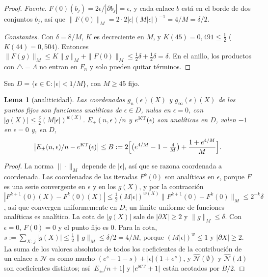 \documentclass[11pt,a4paper]{article}
\newtheorem{lema}[teorema]{Lema}
\theoremstyle{remark}
\begin{document}
\begin{proof}
\emph{Fuente.} $F(0)(b_j)=2\epsilon/|\partial b_j|=\epsilon$, y cada enlace $b$ está en el borde de
dos conjuntos $b_j$, así que $\|F(0)\|_M=2\cdot2|\epsilon|(M|\epsilon|)^{-1}=4/M=\delta/2$.

\emph{Constantes.} Con $\delta=8/M$, $K$ es decreciente en $M$, y $K(45)=0{,}491\le\tfrac12$
($K(44)=0{,}504$). Entonces $\|F(g)\|_M\le K\|g\|_M+\|F(0)\|_M\le\tfrac12\delta+\tfrac12\delta=\delta$.
En el anillo, los productos con $\triangle=\Lambda$ no entran en $F_n$ y solo pueden quitar términos.
\end{proof}

Sea $D=\{\epsilon\in\mathbb C:|\epsilon|<1/M\}$, con $M\ge45$ fijo.

\begin{lema}[analiticidad]\label{lem:analitico}
Las coordenadas $g_n(\epsilon)(X)$ y $g_\infty(\epsilon)(X)$ de los puntos fijos son funciones analíticas de
$\epsilon\in D$, nulas en $\epsilon=0$, con $|g(X)|\le\tfrac\delta2(M|\epsilon|)^{w(X)}$. $E_\pm(n,\epsilon)/n$ y
$e^{\rm KT}(\epsilon)$ son analíticas en $D$, valen $-1$ en $\epsilon=0$ y, en $D$,
\[
  \big|E_\pm(n,\epsilon)/n-e^{\rm KT}(\epsilon)\big|\le B:=2\Big[\big(e^{4/M}-1-\tfrac4M\big)+\frac{1+e^{4/M}}M\Big].
\]
\end{lema}

\begin{proof}
La norma $\|\cdot\|_M$ depende de $|\epsilon|$, así que se razona coordenada a coordenada. Las coordenadas
de las iteradas $F^k(0)$ son analíticas en $\epsilon$, porque $F$ es una serie convergente en $\epsilon$ y
en los $g(X)$, y por la contracción
$|F^{k+1}(0)(X)-F^k(0)(X)|\le\tfrac12(M|\epsilon|)^{w(X)}\|F^{k+1}(0)-F^k(0)\|_M\le2^{-k}\delta$, así que
convergen uniformemente en $D$; un límite uniforme de funciones analíticas es analítico. La cota de
$|g(X)|$ sale de $|\partial X|\ge2$ y $\|g\|_M\le\delta$. Con $\epsilon=0$, $F(0)=0$ y el punto fijo es $0$. Para
la cota, $s:=\sum_{X:\,j}|g(X)|\le\tfrac12\|g\|_M\le\delta/2=4/M$, porque $(M|\epsilon|)^{w}\le1$ y
$|\partial X|\ge2$. La suma de los valores absolutos de todos los coeficientes de la contribución de
un enlace a $\mathcal N$ es como mucho $(e^s-1-s)+|\epsilon|(1+e^s)$, y $\widehat{\mathcal N}(\emptyset)$ y
$\widehat{\mathcal N}(\Lambda)$ son coeficientes distintos; así $|E_\pm/n+1|$ y $|e^{\rm KT}+1|$ están
acotados por $B/2$.
\end{proof}
\end{document}
